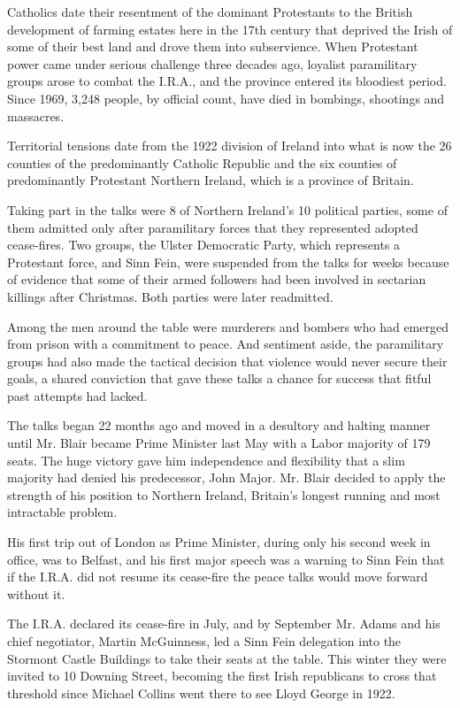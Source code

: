 Catholics date their resentment of the dominant Protestants to the
British development of farming estates here in the 17th century that
deprived the Irish of some of their best land and drove them into
subservience. When Protestant power came under serious challenge three
decades ago, loyalist paramilitary groups arose to combat the I.R.A.,
and the province entered its bloodiest period. Since 1969, 3,248 people,
by official count, have died in bombings, shootings and massacres.

Territorial tensions date from the 1922 division of Ireland into what is
now the 26 counties of the predominantly Catholic Republic and the six
counties of predominantly Protestant Northern Ireland, which is a
province of Britain.

Taking part in the talks were 8 of Northern Ireland's 10 political
parties, some of them admitted only after paramilitary forces that they
represented adopted cease-fires. Two groups, the Ulster Democratic
Party, which represents a Protestant force, and Sinn Fein, were
suspended from the talks for weeks because of evidence that some of
their armed followers had been involved in sectarian killings after
Christmas. Both parties were later readmitted.

Among the men around the table were murderers and bombers who had
emerged from prison with a commitment to peace. And sentiment aside, the
paramilitary groups had also made the tactical decision that violence
would never secure their goals, a shared conviction that gave these
talks a chance for success that fitful past attempts had lacked.

The talks began 22 months ago and moved in a desultory and halting
manner until Mr. Blair became Prime Minister last May with a Labor
majority of 179 seats. The huge victory gave him independence and
flexibility that a slim majority had denied his predecessor, John Major.
Mr. Blair decided to apply the strength of his position to Northern
Ireland, Britain's longest running and most intractable problem.

His first trip out of London as Prime Minister, during only his second
week in office, was to Belfast, and his first major speech was a warning
to Sinn Fein that if the I.R.A. did not resume its cease-fire the peace
talks would move forward without it.

The I.R.A. declared its cease-fire in July, and by September Mr. Adams
and his chief negotiator, Martin McGuinness, led a Sinn Fein delegation
into the Stormont Castle Buildings to take their seats at the table.
This winter they were invited to 10 Downing Street, becoming the first
Irish republicans to cross that threshold since Michael Collins went
there to see Lloyd George in 1922.

